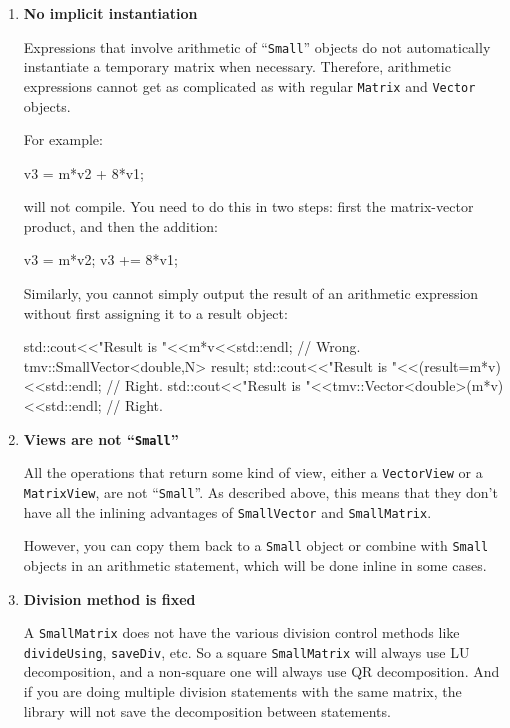 \documentclass[twoside,letterpaper,11pt]{article}
\renewcommand{\tt}[1]{{\lstinline {#1}}}
\begin{document}
\begin{enumerate}
\item
\textbf{No implicit instantiation}

Expressions that involve arithmetic of ``\tt{Small}'' objects do not automatically
instantiate a temporary matrix when necessary.  Therefore, arithmetic 
expressions cannot get as complicated as with regular \tt{Matrix} and 
\tt{Vector} objects.

For example:
\begin{tmvcode}
v3 = m*v2 + 8*v1;
\end{tmvcode}
will not compile.  You need to do this in two steps: first the matrix-vector product, 
and then the addition:
\begin{tmvcode}
v3 = m*v2;
v3 += 8*v1;
\end{tmvcode}

Similarly, you cannot simply output the result of an arithmetic expression without
first assigning it to a result object:
\begin{tmvcode}
std::cout<<"Result is "<<m*v<<std::endl;          // Wrong.
tmv::SmallVector<double,N> result;
std::cout<<"Result is "<<(result=m*v)<<std::endl; // Right.
std::cout<<"Result is "<<tmv::Vector<double>(m*v)<<std::endl; // Right.
\end{tmvcode}

\item
\textbf{Views are not ``\tt{Small}''}

All the operations that return some kind of view,
either a \tt{VectorView} or a \tt{MatrixView}, are not ``\tt{Small}''.
As described above, this means that they don't have all the inlining advantages of 
\tt{SmallVector} and \tt{SmallMatrix}.  

However, you can copy them back to a \tt{Small} object or combine
with \tt{Small} objects in an arithmetic statement, which will be done inline
in some cases.

\item
\textbf{Division method is fixed}

A \tt{SmallMatrix} does not have the various division control methods 
like \tt{divideUsing}, \tt{saveDiv}, etc.
So a square \tt{SmallMatrix} will always use
LU decomposition, and a non-square one will always use QR decomposition.
And if you are doing multiple division statements with the same matrix,
the library will not save the decomposition between statements.  

\end{enumerate}
\end{document}
